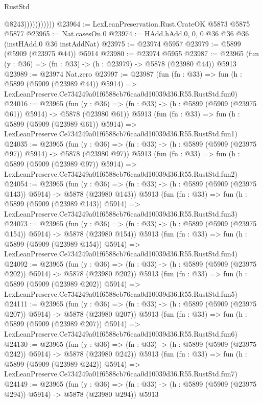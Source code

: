 \begin{lexlean}{RustStd}
\begin{coremodule}
{{                          @8243)))))))))))
@23964 := LexLeanPreservation.Rust.CrateOK @5873 @5875 @5877
@23965 := Nat.casesOn.{0}
@23974 := HAdd.hAdd.{0, 0, 0} @36 @36 @36 (instHAdd.{0} @36 instAddNat)
@23975 := @23974 @5957
@23979 := @5899 (@5909 (@23975 @44)) @5914
@23980 := @23974 @5955
@23987 := @23965 (fun (y : @36) => (fn : @33) -> (h : @23979) -> @5878 (@23980 @44)) @5913
@23989 := @23974 Nat.zero
@23997 := @23987
    (fun (fn : @33) =>
    fun (h : @5899 (@5909 (@23989 @44)) @5914) =>
    LexLeanPreserve.Ce734249a01f6588cb76caa0d10039d36.R55.RustStd.fun0)
@24016 := @23965
    (fun (y : @36) => (fn : @33) -> (h : @5899 (@5909 (@23975 @61)) @5914) -> @5878 (@23980 @61))
    @5913
    (fun (fn : @33) =>
    fun (h : @5899 (@5909 (@23989 @61)) @5914) =>
    LexLeanPreserve.Ce734249a01f6588cb76caa0d10039d36.R55.RustStd.fun1)
@24035 := @23965
    (fun (y : @36) => (fn : @33) -> (h : @5899 (@5909 (@23975 @97)) @5914) -> @5878 (@23980 @97))
    @5913
    (fun (fn : @33) =>
    fun (h : @5899 (@5909 (@23989 @97)) @5914) =>
    LexLeanPreserve.Ce734249a01f6588cb76caa0d10039d36.R55.RustStd.fun2)
@24054 := @23965
    (fun (y : @36) => (fn : @33) -> (h : @5899 (@5909 (@23975 @143)) @5914) -> @5878 (@23980 @143))
    @5913
    (fun (fn : @33) =>
    fun (h : @5899 (@5909 (@23989 @143)) @5914) =>
    LexLeanPreserve.Ce734249a01f6588cb76caa0d10039d36.R55.RustStd.fun3)
@24073 := @23965
    (fun (y : @36) => (fn : @33) -> (h : @5899 (@5909 (@23975 @154)) @5914) -> @5878 (@23980 @154))
    @5913
    (fun (fn : @33) =>
    fun (h : @5899 (@5909 (@23989 @154)) @5914) =>
    LexLeanPreserve.Ce734249a01f6588cb76caa0d10039d36.R55.RustStd.fun4)
@24092 := @23965
    (fun (y : @36) => (fn : @33) -> (h : @5899 (@5909 (@23975 @202)) @5914) -> @5878 (@23980 @202))
    @5913
    (fun (fn : @33) =>
    fun (h : @5899 (@5909 (@23989 @202)) @5914) =>
    LexLeanPreserve.Ce734249a01f6588cb76caa0d10039d36.R55.RustStd.fun5)
@24111 := @23965
    (fun (y : @36) => (fn : @33) -> (h : @5899 (@5909 (@23975 @207)) @5914) -> @5878 (@23980 @207))
    @5913
    (fun (fn : @33) =>
    fun (h : @5899 (@5909 (@23989 @207)) @5914) =>
    LexLeanPreserve.Ce734249a01f6588cb76caa0d10039d36.R55.RustStd.fun6)
@24130 := @23965
    (fun (y : @36) => (fn : @33) -> (h : @5899 (@5909 (@23975 @242)) @5914) -> @5878 (@23980 @242))
    @5913
    (fun (fn : @33) =>
    fun (h : @5899 (@5909 (@23989 @242)) @5914) =>
    LexLeanPreserve.Ce734249a01f6588cb76caa0d10039d36.R55.RustStd.fun7)
@24149 := @23965
    (fun (y : @36) => (fn : @33) -> (h : @5899 (@5909 (@23975 @294)) @5914) -> @5878 (@23980 @294))
    @5913
}}
\end{coremodule}
\end{lexlean}
